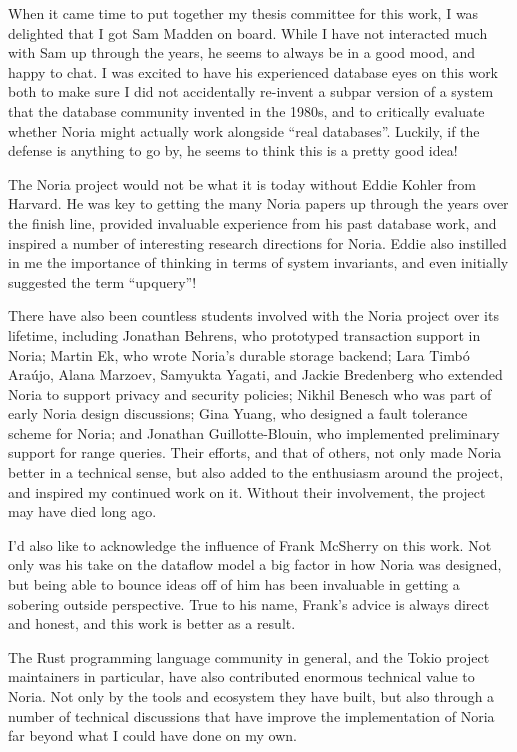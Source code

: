 When it came time to put together my thesis committee for this work, I was
delighted that I got Sam Madden on board. While I have not interacted much with
Sam up through the years, he seems to always be in a good mood, and happy to
chat. I was excited to have his experienced database eyes on this work both to
make sure I did not accidentally re-invent a subpar version of a system that the
database community invented in the 1980s, and to critically evaluate whether
Noria might actually work alongside ``real databases''. Luckily, if the defense
is anything to go by, he seems to think this is a pretty good idea!

The Noria project would not be what it is today without Eddie Kohler from
Harvard. He was key to getting the many Noria papers up through the years over
the finish line, provided invaluable experience from his past database work, and
inspired a number of interesting research directions for Noria. Eddie also
instilled in me the importance of thinking in terms of system invariants, and
even initially suggested the term ``upquery''!

There have also been countless students involved with the Noria project over its
lifetime, including Jonathan Behrens, who prototyped transaction support in
Noria; Martin Ek, who wrote Noria's durable storage backend; Lara Timb\'{o}
Ara\'{u}jo, Alana Marzoev, Samyukta Yagati, and Jackie Bredenberg who extended
Noria to support privacy and security policies; Nikhil Benesch who was part of
early Noria design discussions; Gina Yuang, who designed a fault tolerance
scheme for Noria; and Jonathan Guillotte-Blouin, who implemented preliminary
support for range queries. Their efforts, and that of others, not only made
Noria better in a technical sense, but also added to the enthusiasm around the
project, and inspired my continued work on it. Without their involvement, the
project may have died long ago.

I'd also like to acknowledge the influence of Frank McSherry on this work. Not
only was his take on the dataflow model a big factor in how Noria was designed,
but being able to bounce ideas off of him has been invaluable in getting a
sobering outside perspective. True to his name, Frank's advice is always direct
and honest, and this work is better as a result.

The Rust programming language community in general, and the Tokio project
maintainers in particular, have also contributed enormous technical value to
Noria. Not only by the tools and ecosystem they have built, but also through a
number of technical discussions that have improve the implementation of Noria
far beyond what I could have done on my own.

